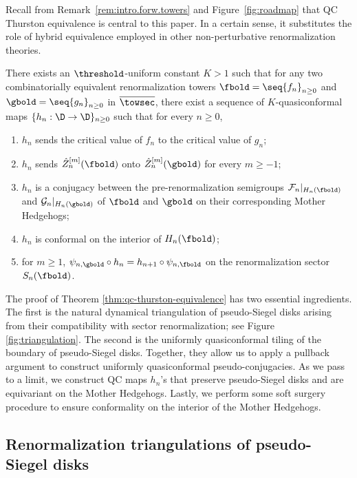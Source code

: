 \documentclass{amsart}
\begin{document}
Recall from Remark~\ref{rem:intro.forw.towers} and Figure~\ref{fig:roadmap} that QC Thurston equivalence is central to this paper. In a certain sense, it substitutes the role of hybrid equivalence employed in other non-perturbative renormalization theories.

\begin{theorem}
\label{thm:qc-thurston-equivalence}
    There exists an $\threshold$-uniform constant $K>1$ such that for any two combinatorially equivalent renormalization towers $\fbold = \seq{f_n}_{n\geq 0}$ and $\gbold = \seq{g_n}_{n\geq 0}$ in $\overline{\towsec}$, there exist a sequence of $K$-quasiconformal maps $\{h_n : \D \to \D\}_{n \geq 0}$ such that for every $n \geq 0$,
    \begin{enumerate}
        \item $h_n$ sends the critical value of $f_n$ to the critical value of $g_n$;
        \item $h_n$ sends $\hat{Z}^{[m]}_n(\fbold)$ onto $\hat{Z}^{[m]}_n(\gbold)$ for every $m \geq -1$;
        \item $h_n$ is a conjugacy between the pre-renormalization semigroups $\mathcal{F}_n|_{H_n(\fbold)}$ and $\mathcal{G}_n|_{H_n(\gbold)}$ of $\fbold$ and $\gbold$ on their corresponding Mother Hedgehogs;
        \item $h_n$ is conformal on the interior of $H_n(\fbold)$;
        \item for $m \geq 1$, $\psi_{n,\gbold} \circ h_n = h_{n+1} \circ \psi_{n,\fbold}$ on the renormalization sector $S_n(\fbold)$.
    \end{enumerate}
\end{theorem}

The proof of Theorem \ref{thm:qc-thurston-equivalence} has two essential ingredients.
The first is the natural dynamical triangulation of pseudo-Siegel disks arising from their compatibility with sector renormalization; see Figure \ref{fig:triangulation}.
The second is the uniformly quasiconformal tiling of the boundary of pseudo-Siegel disks.
Together, they allow us to apply a pullback argument to construct uniformly quasiconformal pseudo-conjugacies.
As we pass to a limit, we construct QC maps $h_n$'s that preserve pseudo-Siegel disks and are equivariant on the Mother Hedgehogs.
Lastly, we perform some soft surgery procedure to ensure conformality on the interior of the Mother Hedgehogs.

\subsection{Renormalization triangulations of pseudo-Siegel disks}
\label{ss:renorm-tiling}
\end{document}
